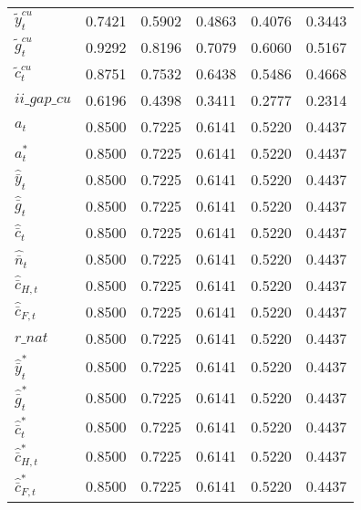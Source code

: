 \begin{center}
\begin{longtable}{lccccc}
${\tilde y_t^{cu}}        $	 & 	    0.7421	 & 	    0.5902	 & 	    0.4863	 & 	    0.4076	 & 	    0.3443 \\ 
${\tilde g_t^{cu}}        $	 & 	    0.9292	 & 	    0.8196	 & 	    0.7079	 & 	    0.6060	 & 	    0.5167 \\ 
${\tilde c_t^{cu}}        $	 & 	    0.8751	 & 	    0.7532	 & 	    0.6438	 & 	    0.5486	 & 	    0.4668 \\ 
$ii\_gap\_cu              $	 & 	    0.6196	 & 	    0.4398	 & 	    0.3411	 & 	    0.2777	 & 	    0.2314 \\ 
${a_t}                    $	 & 	    0.8500	 & 	    0.7225	 & 	    0.6141	 & 	    0.5220	 & 	    0.4437 \\ 
${a_t^*}                  $	 & 	    0.8500	 & 	    0.7225	 & 	    0.6141	 & 	    0.5220	 & 	    0.4437 \\ 
${\hat {\bar y}_t}        $	 & 	    0.8500	 & 	    0.7225	 & 	    0.6141	 & 	    0.5220	 & 	    0.4437 \\ 
${\hat {\bar g}_t}        $	 & 	    0.8500	 & 	    0.7225	 & 	    0.6141	 & 	    0.5220	 & 	    0.4437 \\ 
${\hat {\bar c}_t}        $	 & 	    0.8500	 & 	    0.7225	 & 	    0.6141	 & 	    0.5220	 & 	    0.4437 \\ 
${\hat {\bar n}_t}        $	 & 	    0.8500	 & 	    0.7225	 & 	    0.6141	 & 	    0.5220	 & 	    0.4437 \\ 
${\hat {\bar c}_{H,t}}    $	 & 	    0.8500	 & 	    0.7225	 & 	    0.6141	 & 	    0.5220	 & 	    0.4437 \\ 
${\hat {\bar c}_{F,t}}    $	 & 	    0.8500	 & 	    0.7225	 & 	    0.6141	 & 	    0.5220	 & 	    0.4437 \\ 
$r\_nat                   $	 & 	    0.8500	 & 	    0.7225	 & 	    0.6141	 & 	    0.5220	 & 	    0.4437 \\ 
${\hat {\bar y}_t^*}      $	 & 	    0.8500	 & 	    0.7225	 & 	    0.6141	 & 	    0.5220	 & 	    0.4437 \\ 
${\hat {\bar g}_t^*}      $	 & 	    0.8500	 & 	    0.7225	 & 	    0.6141	 & 	    0.5220	 & 	    0.4437 \\ 
${\hat {\bar c}_t^*}      $	 & 	    0.8500	 & 	    0.7225	 & 	    0.6141	 & 	    0.5220	 & 	    0.4437 \\ 
${\hat {\bar c}_{H,t}^*}  $	 & 	    0.8500	 & 	    0.7225	 & 	    0.6141	 & 	    0.5220	 & 	    0.4437 \\ 
${\hat {\bar c}_{F,t}^*}  $	 & 	    0.8500	 & 	    0.7225	 & 	    0.6141	 & 	    0.5220	 & 	    0.4437 \\ 

\end{longtable}
\end{center}
